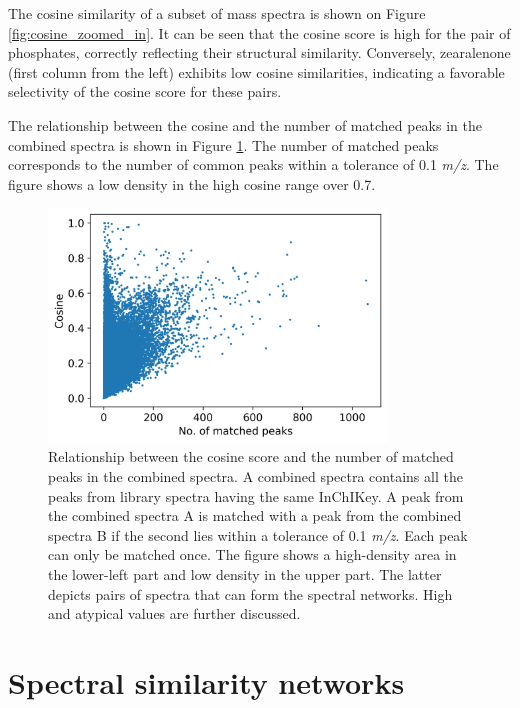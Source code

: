 The cosine similarity of a subset of mass spectra is shown on Figure \ref{fig:cosine_zoomed_in}. It can be seen that the cosine score is high for the pair of phosphates, correctly reflecting their structural similarity. Conversely, zearalenone (first column from the left) exhibits low cosine similarities, indicating a favorable selectivity of the cosine score for these pairs.

The relationship between the cosine and the number of matched peaks in the combined spectra is shown in Figure \ref{fig:cosine_ij}. The number of matched peaks corresponds to the number of common peaks within a tolerance of 0.1 \textit{m/z}. The figure shows a low density in the high cosine range over 0.7. 



\begin{figure}[h]
\centering
  \includegraphics[width=0.8\textwidth]{include/img/results/cosine_ij.png}
  \caption{Relationship between the cosine score and the number of matched peaks in the combined spectra. A combined spectra contains all the peaks from library spectra having the same InChIKey. A peak from the combined spectra A is matched with a peak from the combined spectra B if the second lies within a tolerance of 0.1 \textit{m/z}. Each peak can only be matched once. The figure shows a high-density area in the lower-left part and low density in the upper part. The latter depicts pairs of spectra that can form the spectral networks. High and atypical values are further discussed.}
  \label{fig:cosine_ij}
\end{figure}

\clearpage
{}
\section*{Spectral similarity networks}
\label{sec:networks}

